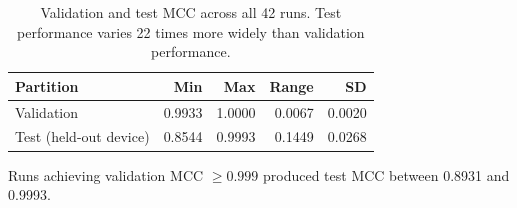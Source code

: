 \begin{table}[htbp]
\centering
\caption{Validation and test MCC across all 42 runs. Test performance varies 22 times more widely than validation performance.}
\label{tab:val-vs-test}
\small
\begin{tabular}{lrrrr}
\toprule
Partition & Min & Max & Range & SD \\
\midrule
Validation & 0.9933 & 1.0000 & 0.0067 & 0.0020 \\
Test (held-out device) & 0.8544 & 0.9993 & 0.1449 & 0.0268 \\
\bottomrule
\end{tabular}

\vspace{2pt}
\footnotesize Runs achieving validation MCC $\geq 0.999$ produced test MCC between 0.8931 and 0.9993.
\end{table}
